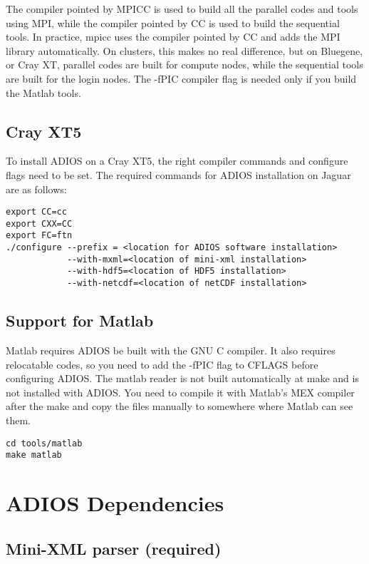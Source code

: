 The compiler pointed by MPICC is used to build all the parallel codes and tools 
using MPI, while the compiler pointed by CC is used to build the sequential tools. 
In practice, mpicc uses the compiler pointed by CC and adds the MPI library automatically. 
On clusters, this makes no real difference, but on Bluegene, or Cray XT, parallel 
codes are built for compute nodes, while the sequential tools are built for the 
login nodes. The -fPIC compiler flag is needed only if you build the Matlab tools.


\subsection{Cray XT5}

To install ADIOS on a Cray XT5, the right compiler commands and configure flags 
need to be set. The required commands for ADIOS installation on Jaguar are as follows:

\begin{lstlisting}
export CC=cc
export CXX=CC
export FC=ftn
./configure --prefix = <location for ADIOS software installation>
            --with-mxml=<location of mini-xml installation>
            --with-hdf5=<location of HDF5 installation>
            --with-netcdf=<location of netCDF installation>
\end{lstlisting}


\subsection{Support for Matlab}

Matlab requires ADIOS be built with the GNU C compiler. It also requires relocatable 
codes, so you need to add the -fPIC flag to CFLAGS before configuring ADIOS. The 
matlab reader is not built automatically at make and is not installed with ADIOS. 
You need to compile it with Matlab's MEX compiler after the make and copy the files 
manually to somewhere where Matlab can see them.

\begin{lstlisting}
cd tools/matlab
make matlab
\end{lstlisting}


\section{ADIOS Dependencies}

\subsection{Mini-XML parser (required)}

